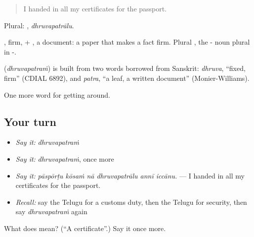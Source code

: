 \begin{quote}
I handed in all my certificates for the passport.
\end{quote}

Plural: , \emph{dhruvapatrālu}.

, firm, + , a document: a paper that makes a fact firm. Plural , the - noun plural in -.

\begin{cousinweb}
\textbf{} (\emph{dhruvapatraṁ}) is built from two words borrowed from Sanskrit: \emph{dhruva}, \textquotedblleft{}fixed, firm\textquotedblright{} (CDIAL 6892), and \emph{patra}, \textquotedblleft{}a leaf, a written document\textquotedblright{} (Monier-Williams).
\end{cousinweb}

\begin{grammarlens}[title={What you've built}]
One more word for getting around.
\end{grammarlens}

\subsection*{Your turn}
\begin{itemize}
\raggedright
  \item \emph{Say it:} \emph{dhruvapatraṁ}
  \item \emph{Say it:} \emph{dhruvapatraṁ}, once more
  \item \emph{Say it:} \emph{pāspōrṭu kōsaṁ nā dhruvapatrālu annī iccānu.} — I handed in all my certificates for the passport.
  \item \emph{Recall:} say the Telugu for a customs duty, then the Telugu for security, then say \emph{dhruvapatraṁ} again
\end{itemize}

\begin{tcolorbox}[breakable,colback=teal!4,colframe=teal!35!black,title={Before you move on}]
What does  mean? (\textquotedblleft{}A certificate\textquotedblright{}.) Say it once more.
\end{tcolorbox}
